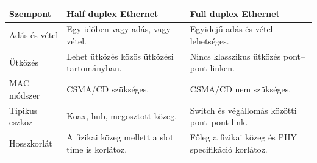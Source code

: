
\begin{tabularx}{\textwidth}{L{30mm}L{43mm}X}
\toprule
\textbf{Szempont} & \textbf{Half duplex Ethernet} & \textbf{Full duplex Ethernet} \\
\midrule
Adás és vétel & Egy időben vagy adás, vagy vétel. & Egyidejű adás és vétel lehetséges. \\
Ütközés & Lehet ütközés közös ütközési tartományban. & Nincs klasszikus ütközés pont--pont linken. \\
MAC módszer & CSMA/CD szükséges. & CSMA/CD nem szükséges. \\
Tipikus eszköz & Koax, hub, megosztott közeg. & Switch és végállomás közötti pont--pont link. \\
Hosszkorlát & A fizikai közeg mellett a slot time is korlátoz. & Főleg a fizikai közeg és PHY specifikáció korlátoz. \\
\bottomrule
\end{tabularx}
